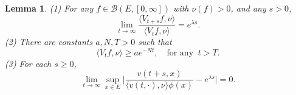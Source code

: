 \documentclass[12pt,a4paper]{amsart}
\numberwithin{equation}{section}
\theoremstyle{plain}
\newtheorem{lem}[thm]{Lemma}
\theoremstyle{definition}
\theoremstyle{remark}
\begin{document}
\begin{lem}\label{lem:ratio limit}
(1) For any $f\in\mathcal B(E,[0,\infty])$ with $\nu(f)>0$, and any $s>0$,
\begin{equation}\label{integ ratio limit}
\lim_{t\to\infty}\dfrac{\langle V_{t+s}f, \nu\rangle}{\langle V_{t}f, \nu\rangle}=e^{\lambda s}.
\end{equation}
(2) There are constants $a,N,T>0$ such that
\begin{equation}\label{inequ:lower}
\langle V_{t}f, \nu\rangle\geq ae^{-Nt},\quad \mbox{for any }\ t>T.
\end{equation}
(3) For each $s\geq 0$,
\begin{equation} \label{one point ratio limit}
	\lim_{t\to \infty} \sup_{x\in E}\Big|\frac{v(t+s,x)}{\langle v(t,\cdot),\nu\rangle\phi(x) } - e^{\lambda s} \Big|=0.
\end{equation}
\end{lem}
\end{document}
